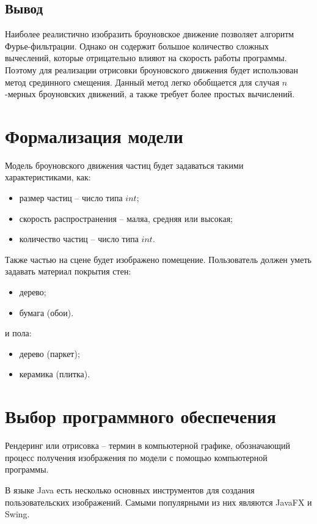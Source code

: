 \subsection*{Вывод}

Наиболее реалистично изобразить броуновское движение позволяет алгоритм Фурье-фильтрации. Однако он содержит большое количество сложных вычеслений, которые отрицательно влияют на скорость работы программы. Поэтому для реализации отрисовки броуновского движения будет использован метод срединного смещения. Данный метод легко обобщается для случая $n$-мерных броуновских движений, а также требует более простых вычислений.

\newpage

\section{Формализация модели}
Модель броуновского движения частиц будет задаваться такими характеристиками, как:
\begin{itemize} 
    \item размер частиц -- число типа $int$;
    \item скорость распространения -- маляа, средняя или высокая;
    \item количество частиц -- число типа $int$.
\end{itemize}

Также частью на сцене будет изображено помещение. Пользователь должен уметь задавать материал покрытия стен:
\begin{itemize} 
	\item дерево;
	\item бумага (обои).
\end{itemize}
 и пола:
\begin{itemize} 
	\item дерево (паркет);
	\item керамика (плитка).
\end{itemize}


\section{Выбор программного обеспечения}

Рендеринг или отрисовка -- термин в компьютерной графике, обозначающий процесс получения изображения по модели с помощью компьютерной программы.

В языке Java есть несколько основных инструментов для создания пользовательских изображений. Самыми популярными из них являются JavaFX и Swing.

